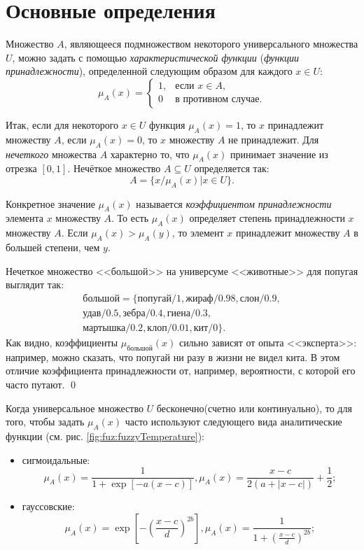 \section{Основные определения}

Множество $A$, являющееся подмножеством некоторого универсального множества $U$, можно задать с помощью \emph{характеристической функции} (\emph{функции принадлежности}), определенной следующим образом для каждого $x\in U$:
\[
    \label{eq:fuz:charFhard}
    \mu_A(x)=
    \begin{cases}
        1,&\text{если $x\in A$},\\
        0 &\text{в противном случае.}
    \end{cases}
\]

Итак, если для некоторого $x\in U$ функция $\mu_A(x)=1$, то $x$ принадлежит множеству $A$, если $\mu_A(x)=0$, то $x$ множеству $A$ не принадлежит. Для \emph{нечеткого} множества $A$ характерно то, что $\mu_A(x)$ принимает значение из отрезка $[0,1]$. Нечёткое множество $A\subseteq U$ определяется так:
\[
    A=\{x/\mu_A(x)|x\in U\}.
\]

Конкретное значение $\mu_A(x)$ называется \emph{коэффициентом принадлежности} элемента $x$ множеству $A$. То есть $\mu_A(x)$ определяет степень принадлежности $x$ множеству $A$. Если $\mu_A(x)>\mu_A(y)$, то элемент $x$ принадлежит множеству $A$ в большей степени, чем $y$.
\begin{exampl}
    Нечеткое множество <<большой>> на универсуме <<животные>> для попугая выглядит так: 
    \[
        \begin{split}
            \text{большой}=\{
                \text{попугай}/1,\text{жираф}/0.98,\text{слон}/0.9,\\
                \text{удав}/0.5,\text{зебра}/0.4,\text{гиена}/0.3,\\
                \text{мартышка}/0.2,\text{клоп}/0.01,\text{кит}/0\}.
        \end{split}
    \]
    Как видно, коэффициенты $\mu_{\text{большой}}(x)$ сильно зависят от опыта <<эксперта>>: например, можно сказать, что попугай ни разу в жизни не видел кита. В этом отличие коэффициента принадлежности от, например, вероятности, с которой его часто путают.
    \qed
\end{exampl}

Когда универсальное множество $U$ бесконечно(счетно или континуально), то для того, чтобы задать $\mu_A(x)$ часто используют следующего вида аналитические функции (см. рис. \ref{fig:fuz:fuzzyTemperature}): 
\begin{itemize}
    \item сигмоидальные:
    \[
        \mu_A(x)=\frac{1}{1+\exp\left[-a(x-c)\right]},\mu_A(x)=\frac{x-c}{2(a+|x-c|)}+\frac{1}{2};
    \]
    
    \item гауссовские:
    \[
        \mu_A(x)=\exp\left[-\left(\frac{x-c}{d}\right)^{2b}\right],
        \mu_A(x)=\frac{1}{1+\left(\frac{x-c}{d}\right)^{2b}};
    \]
\end{itemize}

